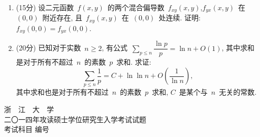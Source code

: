 \documentclass[UTF8,a4paper,11pt]{article}
\begin{document}
\begin{enumerate}
	      \vspace{2em}
	\item (15分) 设二元函数~$f(x,y)$~的两个混合偏导数~$f_{xy}(x,y)$,$f_{yx}(x,y)$~在~$(0,0)$~附近存在, 且~$f_{xy}(x,y)$~在~$(0,0)$~处连续. 证明: $f_{xy}(0,0)=f_{yx}(0,0)$.
	      \vspace{2em}
	\item (20分) 已知对于实数~$n\geqslant 2$, 有公式~$\sum\limits_{p\leqslant n}\dfrac{\ln{p}}{p}=\ln{n}+O(1)$, 其中求和是对于所有不超过~$n$~的素数~$p$~求和. 求证:
	      \[ \sum_{p\leqslant n}\dfrac{1}{p}=C+\ln\ln{n}+O(\dfrac{1}{\ln{n}}),\]
	      其中求和也是对于所有不超过~$n$~的素数~$p$~求和, $C$~是某个与~$n$~无关的常数.
	      \vspace{2em}
\end{enumerate}

\newpage
\setcounter{page}{1}

\begin{center}
	{\Huge 浙~~江~~大~~学}\\
	\setlength{\parskip}{5pt}
	{\Large 二〇一四年攻读硕士学位研究生入学考试试题}\\
	\setlength{\parskip}{10 pt}
	{\Large 考试科目\underline{} 编号\underline{}}
\end{center}
\end{document}
